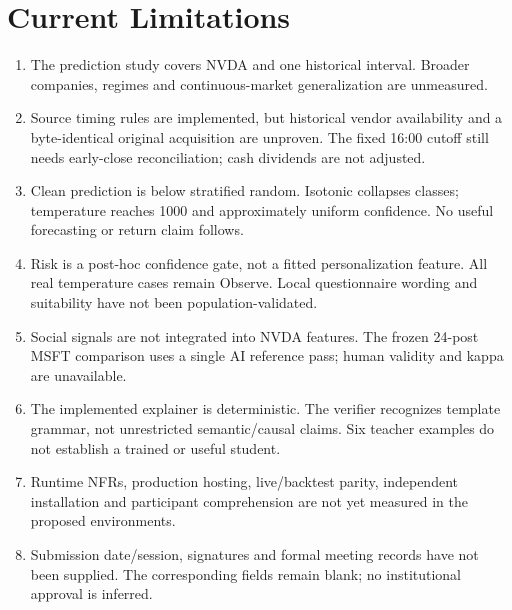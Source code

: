 \section{Current Limitations}
\label{sec:limitations}
\begin{enumerate}
\item The prediction study covers NVDA and one historical interval. Broader companies, regimes and continuous-market generalization are unmeasured.
\item Source timing rules are implemented, but historical vendor availability and a byte-identical original acquisition are unproven. The fixed 16:00 cutoff still needs early-close reconciliation; cash dividends are not adjusted.
\item Clean prediction is below stratified random. Isotonic collapses classes; temperature reaches 1000 and approximately uniform confidence. No useful forecasting or return claim follows.
\item Risk is a post-hoc confidence gate, not a fitted personalization feature. All real temperature cases remain Observe. Local questionnaire wording and suitability have not been population-validated.
\item Social signals are not integrated into NVDA features. The frozen 24-post MSFT comparison uses a single AI reference pass; human validity and kappa are unavailable.
\item The implemented explainer is deterministic. The verifier recognizes template grammar, not unrestricted semantic/causal claims. Six teacher examples do not establish a trained or useful student.
\item Runtime NFRs, production hosting, live/backtest parity, independent installation and participant comprehension are not yet measured in the proposed environments.
\item Submission date/session, signatures and formal meeting records have not been supplied. The corresponding fields remain blank; no institutional approval is inferred.
\end{enumerate}
